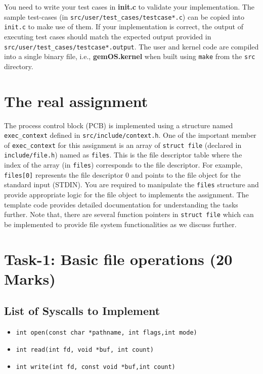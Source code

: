 \documentclass[12pt]{article}
\begin{document}
You need to write your test cases in \textbf{init.c} to validate your implementation. The sample test-cases (in {\tt src/user/test\_cases/testcase*.c})
can be copied into {\tt init.c} to make use of them. If your implementation is correct, the output of executing test cases should match the 
expected output provided in {\tt src/user/test\_cases/testcase*.output}. 
The user and kernel code are compiled into a single binary file, i.e., \textbf{gemOS.kernel} when built using {\tt make} from 
the {\tt src} directory.

\section*{The real assignment}

The process control block (PCB) is implemented using a structure named {\tt exec\_context} defined in {\tt src/include/context.h}.
One of the important member of {\tt exec\_context} for this assignment is an array of {\tt struct file} (declared in {\tt include/file.h}) 
named as {\tt files}. This is the file descriptor table where the index of the array (in {\tt files}) corresponds to the file descriptor. For example,
{\tt files[0]} represents the file descriptor 0 and points to the file object for the standard input (STDIN).
%
You are required to manipulate the {\tt files} structure and provide appropriate logic for the 
file object to implements the assignment. The template code provides detailed documentation for 
understanding the tasks further. Note that, there are several function pointers in {\tt struct file}
which can be implemented to provide file system functionalities as we discuss further.

\section{Task-1: Basic file operations (20 Marks)}

\subsection*{List of Syscalls to Implement}
\begin{itemize}
    \item {\tt int open(const char *pathname, int flags,int mode)}
    \item {\tt int read(int fd, void *buf, int count)}
    \item     {\tt int write(int fd, const void *buf,int count)}
\end{itemize}
\end{document}
